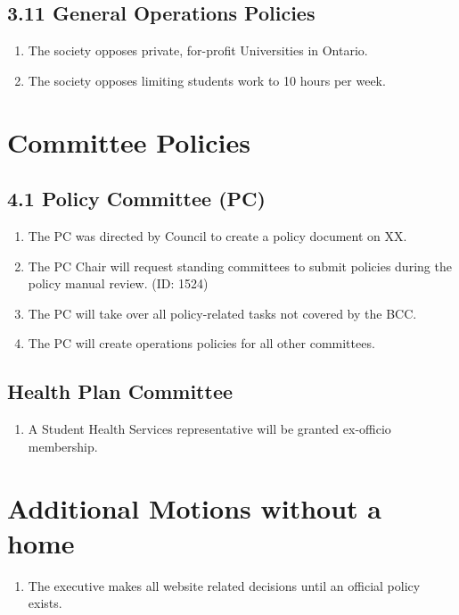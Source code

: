 \subsection{3.11 General Operations Policies}
\begin{enumerate}
\item  The society opposes private, for-profit Universities in Ontario.
\item  The society opposes limiting students work to 10 hours per week.
\end{enumerate}

\section{Committee Policies}
\subsection{4.1 Policy Committee (PC)}
\begin{enumerate}
\item   The PC was directed by Council to create a policy document on XX. 
\item 	The PC Chair will request standing committees to submit policies during the policy manual review. (ID: 1524)
\item 	The PC will take over all policy-related tasks not covered by the BCC. 
\item 	The PC will create operations policies for all other committees.
\end{enumerate}

\subsection{Health Plan Committee}
\begin{enumerate}
\item A Student Health Services representative will be granted ex-officio membership. 
\end{enumerate}

\section{Additional Motions without a home}
\begin{enumerate}
\item	The executive makes all website related decisions until an official policy exists. 
\end{enumerate}
